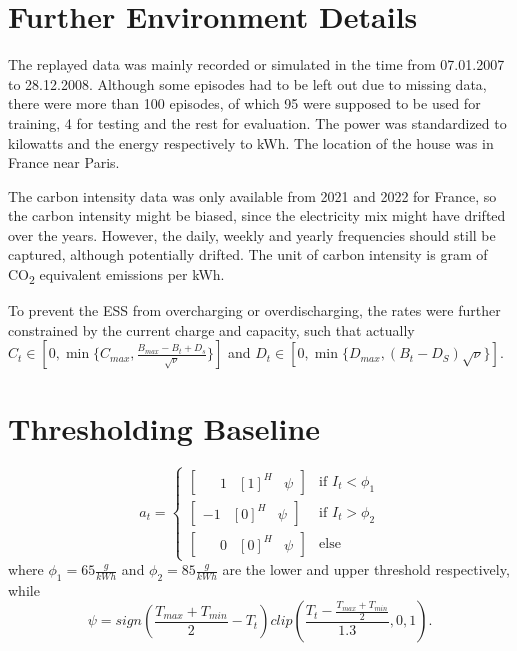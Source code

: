 
\section{Further Environment Details} \label{sec:environment_details}
The replayed data was mainly recorded or simulated  in the time from 07.01.2007 to 28.12.2008. Although some episodes had to be left out due to missing data, there were more than 100 episodes, of which 95 were supposed to be used for training, 4 for testing and the rest for evaluation. The power was standardized to kilowatts and the energy respectively to kWh. The location of the house was in France near Paris.
\par
The carbon intensity data was only available from 2021 and 2022 for France, so the carbon intensity might be biased, since the electricity mix might have drifted over the years. However, the daily, weekly and yearly frequencies should still be captured, although potentially drifted. The unit of carbon intensity is gram of CO\textsubscript{2} equivalent emissions per kWh.
\par To prevent the ESS from overcharging or overdischarging, the rates were further constrained by the current charge and capacity, such that actually $C_t \in [0, \min\{C_{max}, \frac{B_{max} - B_t + D_s}{\sqrt{\nu}}\}]$ and $D_t \in [0, \min\{D_{max}, (B_t - D_S) \sqrt{\nu}\}]$.

\section{Thresholding Baseline} \label{sec:thresholding_baseline}
\begin{equation}
    a_t = \left\{
        \begin{array}{ll}
            \begin{bmatrix} \phantom{-}1 & [1]^H & \psi \end{bmatrix} & \text{if } I_t < \phi_1 \\
            \begin{bmatrix} -1 & [0]^H & \psi \end{bmatrix} & \text{if } I_t > \phi_2 \\
            \begin{bmatrix} \phantom{-}0 & [0]^H & \psi \end{bmatrix} & \text{else}
        \end{array}
    \right.
\end{equation}
where $\phi_1 = 65 \frac{g}{kWh}$ and $\phi_2 = 85 \frac{g}{kWh}$ are the lower and upper threshold respectively, while 
\begin{equation}
    \psi = sign(\frac{T_{max}+T_{min}}{2} - T_{t}) clip(\frac{T_t-\frac{T_{max}+T_{min}}{2}}{1.3},0,1).
\end{equation}

